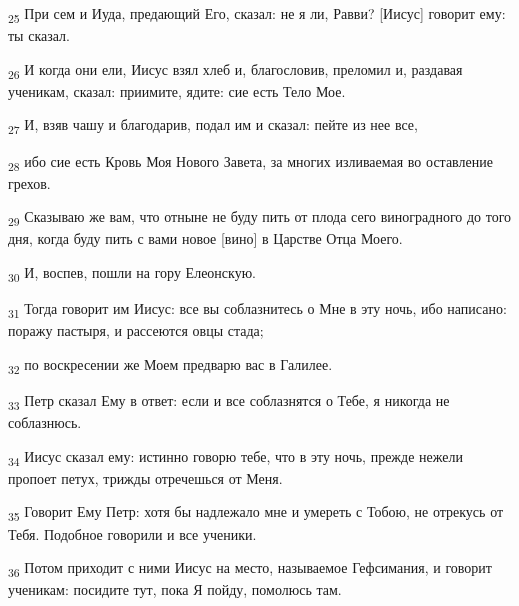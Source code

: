 \begin{tcolorbox}
\textsubscript{25} При сем и Иуда, предающий Его, сказал: не я ли, Равви? [Иисус] говорит ему: ты сказал.
\end{tcolorbox}
\begin{tcolorbox}
\textsubscript{26} И когда они ели, Иисус взял хлеб и, благословив, преломил и, раздавая ученикам, сказал: приимите, ядите: сие есть Тело Мое.
\end{tcolorbox}
\begin{tcolorbox}
\textsubscript{27} И, взяв чашу и благодарив, подал им и сказал: пейте из нее все,
\end{tcolorbox}
\begin{tcolorbox}
\textsubscript{28} ибо сие есть Кровь Моя Нового Завета, за многих изливаемая во оставление грехов.
\end{tcolorbox}
\begin{tcolorbox}
\textsubscript{29} Сказываю же вам, что отныне не буду пить от плода сего виноградного до того дня, когда буду пить с вами новое [вино] в Царстве Отца Моего.
\end{tcolorbox}
\begin{tcolorbox}
\textsubscript{30} И, воспев, пошли на гору Елеонскую.
\end{tcolorbox}
\begin{tcolorbox}
\textsubscript{31} Тогда говорит им Иисус: все вы соблазнитесь о Мне в эту ночь, ибо написано: поражу пастыря, и рассеются овцы стада;
\end{tcolorbox}
\begin{tcolorbox}
\textsubscript{32} по воскресении же Моем предварю вас в Галилее.
\end{tcolorbox}
\begin{tcolorbox}
\textsubscript{33} Петр сказал Ему в ответ: если и все соблазнятся о Тебе, я никогда не соблазнюсь.
\end{tcolorbox}
\begin{tcolorbox}
\textsubscript{34} Иисус сказал ему: истинно говорю тебе, что в эту ночь, прежде нежели пропоет петух, трижды отречешься от Меня.
\end{tcolorbox}
\begin{tcolorbox}
\textsubscript{35} Говорит Ему Петр: хотя бы надлежало мне и умереть с Тобою, не отрекусь от Тебя. Подобное говорили и все ученики.
\end{tcolorbox}
\begin{tcolorbox}
\textsubscript{36} Потом приходит с ними Иисус на место, называемое Гефсимания, и говорит ученикам: посидите тут, пока Я пойду, помолюсь там.
\end{tcolorbox}
